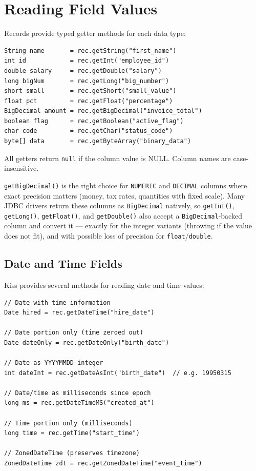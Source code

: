 \section{Reading Field Values}
\label{sec:crud-read}

Records provide typed getter methods for each data type:

\begin{lstlisting}[style=groovy]
String name       = rec.getString("first_name")
int id            = rec.getInt("employee_id")
double salary     = rec.getDouble("salary")
long bigNum       = rec.getLong("big_number")
short small       = rec.getShort("small_value")
float pct         = rec.getFloat("percentage")
BigDecimal amount = rec.getBigDecimal("invoice_total")
boolean flag      = rec.getBoolean("active_flag")
char code         = rec.getChar("status_code")
byte[] data       = rec.getByteArray("binary_data")
\end{lstlisting}

\noindent
All getters return \texttt{null} if the column value is NULL.  Column names are case-insensitive.

\noindent
\texttt{getBigDecimal()} is the right choice for \texttt{NUMERIC} and \texttt{DECIMAL} columns where exact precision matters (money, tax rates, quantities with fixed scale).  Many JDBC drivers return these columns as \texttt{BigDecimal} natively, so \texttt{getInt()}, \texttt{getLong()}, \texttt{getFloat()}, and \texttt{getDouble()} also accept a \texttt{BigDecimal}-backed column and convert it --- exactly for the integer variants (throwing if the value does not fit), and with possible loss of precision for \texttt{float}/\texttt{double}.

\subsection{Date and Time Fields}

Kiss provides several methods for reading date and time values:

\begin{lstlisting}[style=groovy]
// Date with time information
Date hired = rec.getDateTime("hire_date")

// Date portion only (time zeroed out)
Date dateOnly = rec.getDateOnly("birth_date")

// Date as YYYYMMDD integer
int dateInt = rec.getDateAsInt("birth_date")  // e.g. 19950315

// Date/time as milliseconds since epoch
long ms = rec.getDateTimeMS("created_at")

// Time portion only (milliseconds)
long time = rec.getTime("start_time")

// ZonedDateTime (preserves timezone)
ZonedDateTime zdt = rec.getZonedDateTime("event_time")
\end{lstlisting}

